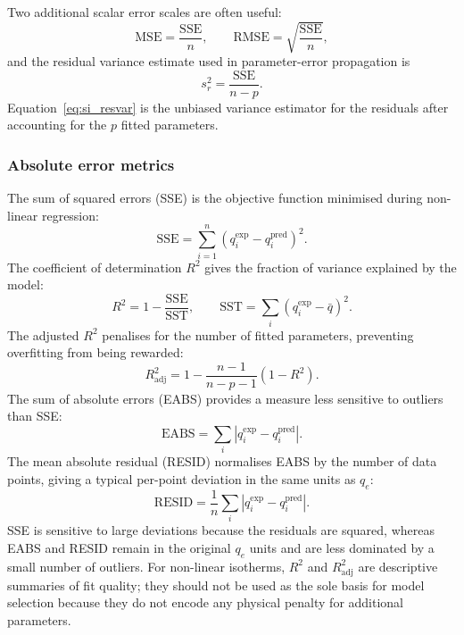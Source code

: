 \documentclass[journal=jacsat,manuscript=article]{achemso}
\begin{document}
Two additional scalar error scales are often useful:
\begin{equation}
	\mathrm{MSE} = \frac{\mathrm{SSE}}{n},
	\qquad
	\mathrm{RMSE} = \sqrt{\frac{\mathrm{SSE}}{n}},
	\label{eq:si_MSE_RMSE}
\end{equation}
and the residual variance estimate used in parameter-error propagation is
\begin{equation}
	s_r^2 = \frac{\mathrm{SSE}}{n-p}.
	\label{eq:si_resvar}
\end{equation}
Equation~\eqref{eq:si_resvar} is the unbiased variance estimator for the
residuals after accounting for the $p$ fitted parameters.

\subsubsection{Absolute error metrics}

The sum of squared errors (SSE) is the objective function minimised
during non-linear regression:
\begin{equation}
	\text{SSE} = \sum_{i=1}^{n}(q_i^{\exp} - q_i^{\mathrm{pred}})^2.
	\label{eq:si_SSE}
\end{equation}
The coefficient of determination $R^2$ gives the fraction of variance
explained by the model:
\begin{equation}
	R^2 = 1 - \frac{\mathrm{SSE}}{\mathrm{SST}},
	\qquad \mathrm{SST} = \sum_{i}(q_i^{\exp} - \bar{q})^2.
	\label{eq:si_R2}
\end{equation}
The adjusted $R^2$ penalises for the number of fitted parameters,
preventing overfitting from being rewarded:
\begin{equation}
	R^2_{\mathrm{adj}} = 1 - \frac{n-1}{n-p-1}(1-R^2).
	\label{eq:si_R2adj}
\end{equation}
The sum of absolute errors (EABS) provides a measure less sensitive
to outliers than SSE:
\begin{equation}
	\text{EABS} = \sum_{i}|q_i^{\exp} - q_i^{\mathrm{pred}}|.
	\label{eq:si_EABS}
\end{equation}
The mean absolute residual (RESID) normalises EABS by the number of
data points, giving a typical per-point deviation in the same units
as $q_e$:
\begin{equation}
	\text{RESID} = \frac{1}{n}\sum_{i}|q_i^{\exp} - q_i^{\mathrm{pred}}|.
	\label{eq:si_RESID}
\end{equation}
SSE is sensitive to large deviations because the residuals are squared,
whereas EABS and RESID remain in the original $q_e$ units and are less
dominated by a small number of outliers. For non-linear isotherms,
$R^2$ and $R^2_{\mathrm{adj}}$ are descriptive summaries of fit quality;
they should not be used as the sole basis for model selection because
they do not encode any physical penalty for additional parameters.
\end{document}
